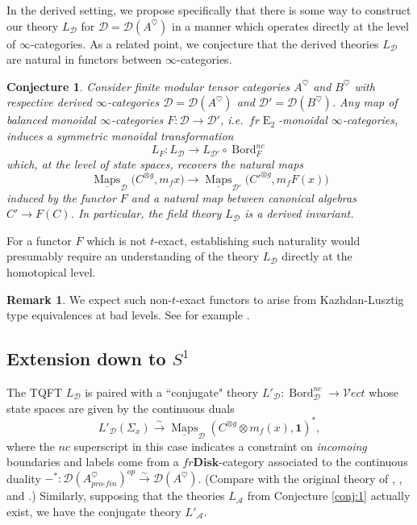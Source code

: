 \documentclass[reqno]{amsart}
\newtheorem{conjecture}[lemma]{Conjecture}
\theoremstyle{definition}
\newtheorem{remark}[lemma]{Remark}
\newcommand{\msc}[1]{\mathscr{#1}}
\newcommand{\opn}[1]{\operatorname{#1}}
\newcommand{\ot}{\otimes}
\newcommand{\Vect}{\msc{V}\!ect}
\newcommand{\Disk}{\mathbf{Disk}}
\newcommand{\pf}{pro\text{-}fin}
\DeclareMathOperator{\Maps}{Maps}
\DeclareMathOperator{\Bord}{Bord}
\renewcommand{\1}{\mathbf{1}}
\begin{document}
In the derived setting, we propose specifically that there is some way to construct our theory $L_{\msc{D}}$ for $\msc{D}=\msc{D}(A^{\heartsuit})$ in a manner which operates directly at the level of $\infty$-categories. As a related point, we conjecture that the derived theories $L_{\msc{D}}$ are natural in functors between $\infty$-categories.

\begin{conjecture}\label{conj:2}
Consider finite modular tensor categories $A^{\heartsuit}$ and $B^{\heartsuit}$ with respective derived $\infty$-categories $\msc{D}=\msc{D}(A^{\heartsuit})$ and $\msc{D}'=\msc{D}(B^{\heartsuit})$. Any map of balanced monoidal $\infty$-categories $F:\msc{D}\to \msc{D}'$, i.e.\ $fr\opn{E}_2$-monoidal $\infty$-categories, induces a symmetric monoidal transformation
\[
L_F:L_{\msc{D}}\to L_{\msc{D}'}\circ \Bord^{nc}_F
\]
which, at the level of state spaces, recovers the natural maps
\[
\underline{\Maps}_{\msc{D}}\big(C^{\ot g},m_fx\big)\to \underline{\Maps}_{\msc{D}'}\big({C'}^{\ot g},m_fF(x)\big)
\]
induced by the functor $F$ and a natural map between canonical algebras $C'\to F(C)$.  In particular, the field theory $L_{\msc{D}}$ is a derived invariant.
\end{conjecture}

For a functor $F$ which is not $t$-exact, establishing such naturality would presumably require an understanding of the theory $L_{\msc{D}}$ directly at the homotopical level.

\begin{remark}
We expect such non-$t$-exact functors to arise from Kazhdan-Lusztig type equivalences at bad levels.  See for example \cite[Theorem 7.13]{mcraeyang23}.
\end{remark}

\subsection{Extension down to $S^1$}

The TQFT $L_{\msc{D}}$ is paired with a ``conjugate" theory $L'_{\msc{D}}:\Bord^{nc}_{\msc{D}}\to \Vect$ whose state spaces are given by the continuous duals
\[
L'_{\msc{D}}(\Sigma_x)\overset{\sim}\to \underline{\Maps}_{\msc{D}}(C^{\ot g}\ot m_f(x),\1)^{\ast},
\]
where the $nc$ superscript in this case indicates a constraint on \emph{incomoing} boundaries and labels come from a $fr\Disk$-category associated to the continuous duality $-^{\ast}:\msc{D}(A^{\heartsuit}_{\pf})^{op}\overset{\sim}\to\msc{D}(A^{\heartsuit})$.  (Compare with the original theory of \cite{derenzietal23}, \cite{lagiotis}, and \cite[proof of Theorem 7.11]{czenkynegron}.) Similarly, supposing that the theories $L_{\msc{A}}$ from Conjecture \ref{conj:1} actually exist, we have the conjugate theory $L'_{\msc{A}}$.
\end{document}
